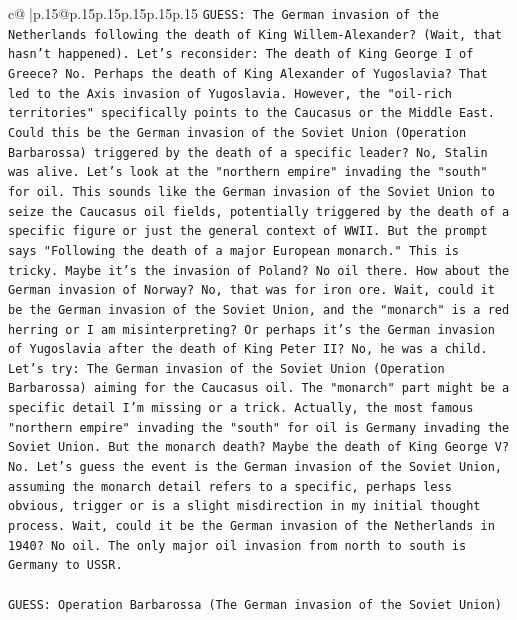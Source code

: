 \documentclass{article}
\begin{document}
{\begin{supertabular}{c@{$\;$}|p{.15\linewidth}@{}p{.15\linewidth}p{.15\linewidth}p{.15\linewidth}p{.15\linewidth}p{.15\linewidth}}
{{{\texttt{GUESS: The German invasion of the Netherlands following the death of King Willem{-}Alexander? (Wait, that hasn't happened). Let's reconsider: The death of King George I of Greece? No. Perhaps the death of King Alexander of Yugoslavia? That led to the Axis invasion of Yugoslavia. However, the "oil{-}rich territories" specifically points to the Caucasus or the Middle East. Could this be the German invasion of the Soviet Union (Operation Barbarossa) triggered by the death of a specific leader? No, Stalin was alive. Let's look at the "northern empire" invading the "south" for oil. This sounds like the German invasion of the Soviet Union to seize the Caucasus oil fields, potentially triggered by the death of a specific figure or just the general context of WWII. But the prompt says "Following the death of a major European monarch." This is tricky. Maybe it's the invasion of Poland? No oil there. How about the German invasion of Norway? No, that was for iron ore. Wait, could it be the German invasion of the Soviet Union, and the "monarch" is a red herring or I am misinterpreting? Or perhaps it's the German invasion of Yugoslavia after the death of King Peter II? No, he was a child. Let's try: The German invasion of the Soviet Union (Operation Barbarossa) aiming for the Caucasus oil. The "monarch" part might be a specific detail I'm missing or a trick. Actually, the most famous "northern empire" invading the "south" for oil is Germany invading the Soviet Union. But the monarch death? Maybe the death of King George V? No. Let's guess the event is the German invasion of the Soviet Union, assuming the monarch detail refers to a specific, perhaps less obvious, trigger or is a slight misdirection in my initial thought process. Wait, could it be the German invasion of the Netherlands in 1940? No oil. The only major oil invasion from north to south is Germany to USSR.} \\
\\ 
\texttt{GUESS: Operation Barbarossa (The German invasion of the Soviet Union)} \\
            }
        }
    }
     \\ \\


\end{supertabular}}
\end{document}
